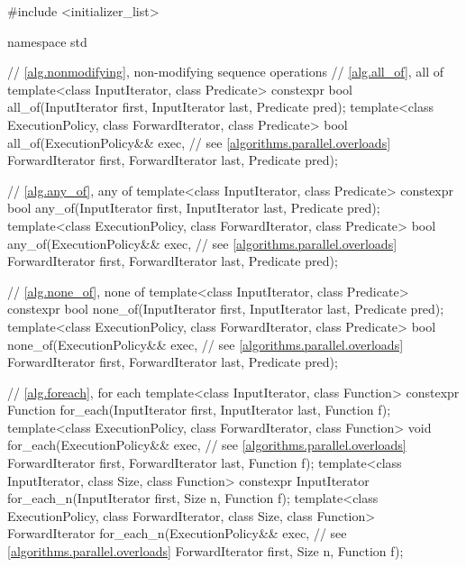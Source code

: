 \begin{codeblock}
#include <initializer_list>

namespace std {
  // \ref{alg.nonmodifying}, non-modifying sequence operations
  // \ref{alg.all_of}, all of
  template<class InputIterator, class Predicate>
    constexpr bool all_of(InputIterator first, InputIterator last, Predicate pred);
  template<class ExecutionPolicy, class ForwardIterator, class Predicate>
    bool all_of(ExecutionPolicy&& exec, // see \ref{algorithms.parallel.overloads}
                ForwardIterator first, ForwardIterator last, Predicate pred);

  // \ref{alg.any_of}, any of
  template<class InputIterator, class Predicate>
    constexpr bool any_of(InputIterator first, InputIterator last, Predicate pred);
  template<class ExecutionPolicy, class ForwardIterator, class Predicate>
    bool any_of(ExecutionPolicy&& exec, // see \ref{algorithms.parallel.overloads}
                ForwardIterator first, ForwardIterator last, Predicate pred);

  // \ref{alg.none_of}, none of
  template<class InputIterator, class Predicate>
    constexpr bool none_of(InputIterator first, InputIterator last, Predicate pred);
  template<class ExecutionPolicy, class ForwardIterator, class Predicate>
    bool none_of(ExecutionPolicy&& exec, // see \ref{algorithms.parallel.overloads}
                 ForwardIterator first, ForwardIterator last, Predicate pred);

  // \ref{alg.foreach}, for each
  template<class InputIterator, class Function>
    constexpr Function for_each(InputIterator first, InputIterator last, Function f);
  template<class ExecutionPolicy, class ForwardIterator, class Function>
    void for_each(ExecutionPolicy&& exec, // see \ref{algorithms.parallel.overloads}
                  ForwardIterator first, ForwardIterator last, Function f);
  template<class InputIterator, class Size, class Function>
    constexpr InputIterator for_each_n(InputIterator first, Size n, Function f);
  template<class ExecutionPolicy, class ForwardIterator, class Size, class Function>
    ForwardIterator for_each_n(ExecutionPolicy&& exec, // see \ref{algorithms.parallel.overloads}
                               ForwardIterator first, Size n, Function f);

}
\end{codeblock}
